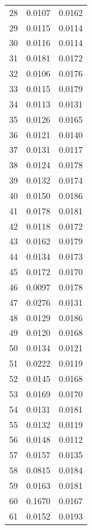 \begin{longtable}{rcc}
28 & 0.0107 & 0.0162 \\
29 & 0.0115 & 0.0114 \\
30 & 0.0116 & 0.0114 \\
31 & 0.0181 & 0.0172 \\
32 & 0.0106 & 0.0176 \\
33 & 0.0115 & 0.0179 \\
34 & 0.0113 & 0.0131 \\
35 & 0.0126 & 0.0165 \\
36 & 0.0121 & 0.0140 \\
37 & 0.0131 & 0.0117 \\
38 & 0.0124 & 0.0178 \\
39 & 0.0132 & 0.0174 \\
40 & 0.0150 & 0.0186 \\
41 & 0.0178 & 0.0181 \\
42 & 0.0118 & 0.0172 \\
43 & 0.0162 & 0.0179 \\
44 & 0.0134 & 0.0173 \\
45 & 0.0172 & 0.0170 \\
46 & 0.0097 & 0.0178 \\
47 & 0.0276 & 0.0131 \\
48 & 0.0129 & 0.0186 \\
49 & 0.0120 & 0.0168 \\
50 & 0.0134 & 0.0121 \\
51 & 0.0222 & 0.0119 \\
52 & 0.0145 & 0.0168 \\
53 & 0.0169 & 0.0170 \\
54 & 0.0131 & 0.0181 \\
55 & 0.0132 & 0.0119 \\
56 & 0.0148 & 0.0112 \\
57 & 0.0157 & 0.0135 \\
58 & 0.0815 & 0.0184 \\
59 & 0.0163 & 0.0181 \\
60 & 0.1670 & 0.0167 \\
61 & 0.0152 & 0.0193 \\
\end{longtable}
